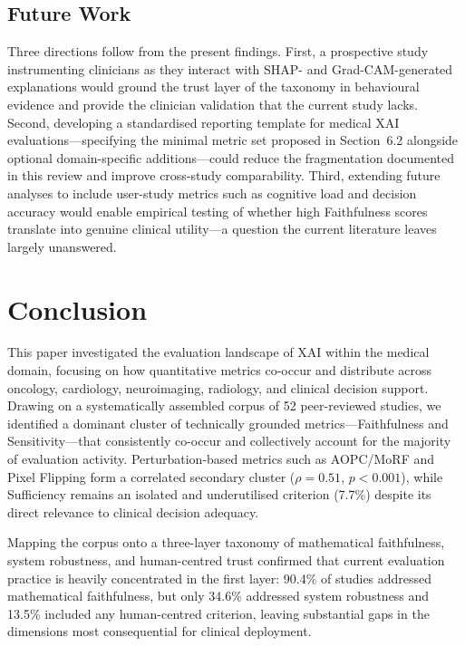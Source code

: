 \subsection{Future Work}

Three directions follow from the present findings. First, a prospective
study instrumenting clinicians as they interact with SHAP- and
Grad-CAM-generated explanations would ground the trust layer of the taxonomy
in behavioural evidence and provide the clinician validation that the
current study lacks. Second, developing a standardised reporting template
for medical XAI evaluations---specifying the minimal metric set proposed in
Section~6.2 alongside optional domain-specific additions---could reduce the
fragmentation documented in this review and improve cross-study
comparability. Third, extending future analyses to include user-study metrics
such as cognitive load and decision accuracy would enable empirical testing
of whether high Faithfulness scores translate into genuine clinical
utility---a question the current literature leaves largely unanswered.


\section{Conclusion}

This paper investigated the evaluation landscape of XAI within the medical
domain, focusing on how quantitative metrics co-occur and distribute across
oncology, cardiology, neuroimaging, radiology, and clinical decision support.
Drawing on a systematically assembled corpus of 52 peer-reviewed studies, we
identified a dominant cluster of technically grounded
metrics---Faithfulness and Sensitivity---that consistently co-occur and
collectively account for the majority of evaluation activity.
Perturbation-based metrics such as AOPC/MoRF and Pixel Flipping form a
correlated secondary cluster ($\rho = 0.51$, $p < 0.001$), while
Sufficiency remains an isolated and underutilised criterion (7.7\%) despite
its direct relevance to clinical decision adequacy.

Mapping the corpus onto a three-layer taxonomy of mathematical faithfulness,
system robustness, and human-centred trust confirmed that current evaluation
practice is heavily concentrated in the first layer: 90.4\% of studies
addressed mathematical faithfulness, but only 34.6\% addressed system
robustness and 13.5\% included any human-centred criterion,
leaving substantial gaps in the dimensions most consequential
for clinical deployment.

